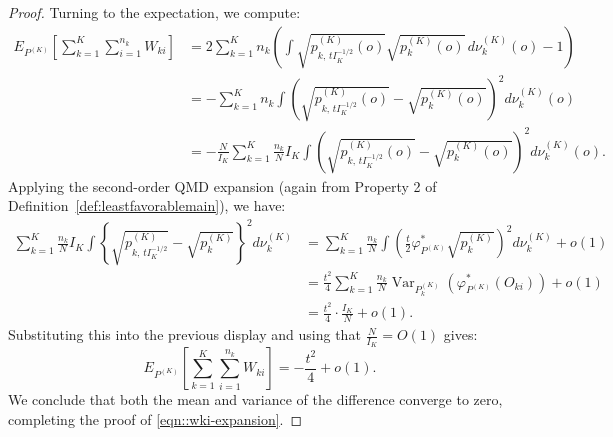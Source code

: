 \documentclass[11pt]{article}
\theoremstyle{plain}
\theoremstyle{definition}
\theoremstyle{remark}
\theoremstyle{definition}
\begin{document}
\begin{proof}
Turning to the expectation, we compute:
\begin{align*}
E_{P^{(K)}}\left[ \sum_{k=1}^K \sum_{i=1}^{n_k} W_{ki} \right] 
&= 2 \sum_{k=1}^K n_k \left( \int \sqrt{p_{k,\,t I_K^{-1/2}}^{(K)}(o)} \sqrt{p_k^{(K)}(o)}\, d\nu_k^{(K)}(o) - 1 \right) \\
&= - \sum_{k=1}^K n_k \int \left( \sqrt{p_{k,\,t I_K^{-1/2}}^{(K)}(o)} - \sqrt{p_k^{(K)}(o)} \right)^2 d\nu_k^{(K)}(o) \\
&= - \frac{N}{I_K} \sum_{k=1}^K \frac{n_k}{N} I_K \int \left( \sqrt{p_{k,\,t I_K^{-1/2}}^{(K)}(o)} - \sqrt{p_k^{(K)}(o)} \right)^2 d\nu_k^{(K)}(o).
\end{align*}
 Applying the second-order QMD expansion (again from Property 2 of Definition~\ref{def:leastfavorablemain}), we have:
\begin{align*}
\sum_{k=1}^K \frac{n_k}{N} I_K \int \left\{ \sqrt{p_{k,\,t I_K^{-1/2}}^{(K)}} - \sqrt{p_k^{(K)}} \right\}^2 d\nu_k^{(K)}
&= \sum_{k=1}^K \frac{n_k}{N} \int \left( \tfrac{t}{2} \varphi_{P^{(K)}}^* \sqrt{p_k^{(K)}} \right)^2 d\nu_k^{(K)} + o(1) \\
&= \frac{t^2}{4} \sum_{k=1}^K \frac{n_k}{N} \operatorname{Var}_{P_k^{(K)}}(\varphi_{P^{(K)}}^*(O_{ki})) + o(1) \\
&= \frac{t^2}{4} \cdot \frac{I_K}{N} + o(1).
\end{align*}
Substituting this into the previous display and using that $\frac{N}{I_K} = O(1)$ gives:
\[
E_{P^{(K)}}\left[ \sum_{k=1}^K \sum_{i=1}^{n_k} W_{ki} \right] = -\frac{t^2}{4} + o(1).
\]
We conclude that both the mean and variance of the difference converge to zero, completing the proof of \eqref{eqn::wki-expansion}.



\end{proof}
\end{document}
